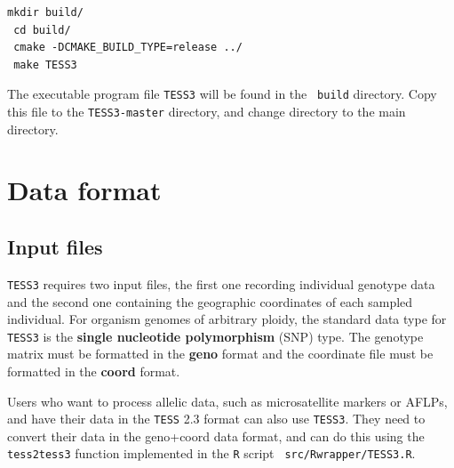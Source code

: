 \documentclass[10pt,a4paper]{article}
\begin{document}
\begin{Verbatim}[frame = single]
 mkdir build/
 cd build/
 cmake -DCMAKE_BUILD_TYPE=release ../
 make TESS3
\end{Verbatim}

 \noindent The executable program file {\tt TESS3} will be found in the {\tt 
build} directory. Copy this file to the \verb|TESS3-master| directory, and 
change directory to the main directory.
 
\section{Data format}

\subsection{Input files}

{\tt TESS3} requires two input files, the first one recording individual 
genotype data and the second one containing the geographic coordinates of  each 
sampled individual. For organism genomes of arbitrary ploidy, the standard data 
type for {\tt TESS3} is the {\bf single nucleotide polymorphism} (SNP) type.  
The genotype matrix must be formatted in the {\bf geno} format and the 
coordinate file must be formatted in the {\bf coord} format.

Users who want to process allelic data, such as microsatellite markers or AFLPs, 
and have their data in the {\tt TESS} 2.3 format can also use {\tt TESS3}. They 
need to convert their data in the geno+coord data format, and can do this using 
the {\tt tess2tess3} function implemented in the {\tt R} script {\tt 
src/Rwrapper/TESS3.R}.
\end{document}
